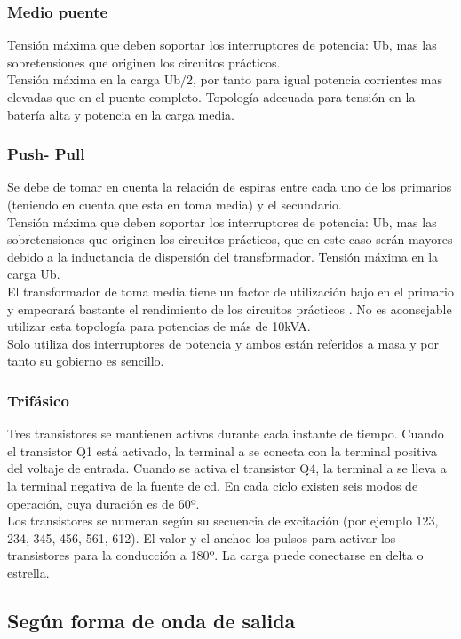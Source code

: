 \documentclass[12pt,a4paper]{article}
\begin{document}
\subsubsection*{Medio puente}
Tensión máxima que deben soportar los interruptores de potencia: Ub, mas las sobretensiones que originen los circuitos prácticos.\\
Tensión máxima en la carga Ub/2, por tanto para igual potencia corrientes mas elevadas que en el puente completo.
Topología adecuada para tensión en la batería alta y potencia en la carga media. \\
\subsubsection*{Push- Pull}
Se debe de tomar en cuenta la relación de espiras entre cada uno de los primarios (teniendo en cuenta que esta en toma media) y el secundario. \\
Tensión máxima que deben soportar los interruptores de potencia: Ub, mas las sobretensiones que originen los circuitos prácticos, que en este caso serán mayores debido a la inductancia de dispersión del transformador.
Tensión máxima en la carga Ub.\\ 
El transformador de toma media tiene un factor de utilización bajo en el primario y empeorará bastante el rendimiento de los circuitos prácticos . No es aconsejable  utilizar esta topología para potencias de más de 10kVA.\\ 
Solo utiliza dos interruptores de potencia y ambos están referidos  a masa y por tanto su gobierno es sencillo.

\subsubsection{Trifásico}
Tres transistores se mantienen  activos durante cada instante de tiempo. Cuando el transistor Q1 está activado, la terminal a se conecta con la terminal positiva del voltaje de entrada. Cuando se activa el transistor Q4, la terminal a se lleva a la terminal negativa de la fuente de cd. En cada ciclo existen seis modos de operación, cuya duración es de 60º.\\
Los transistores se numeran según su secuencia de excitación (por ejemplo 123, 234, 345, 456, 561, 612). El valor y el anchoe los pulsos para activar los transistores para la conducción a 180º. La carga puede conectarse en delta o estrella.

\subsection{Según forma de onda de salida}
\end{document}
